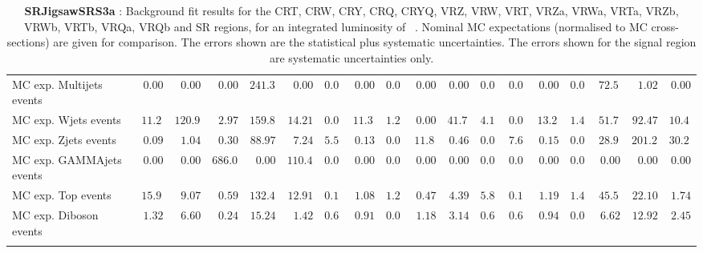 \begin{table}
{\begin{tabular*}{\textwidth}{@{\extracolsep{\fill}}lrrrrrrrrrrrrrrrrr}
\noalign{\smallskip}\hline\noalign{\smallskip}
        MC exp. Multijets events         & $0.00$          & $0.00$          & $0.00$          & $241.37$          & $0.00$          & $0.00$          & $0.00$          & $0.00$          & $0.00$          & $0.00$          & $0.00$          & $0.00$          & $0.00$          & $0.00$          & $72.55$          & $1.02$          & $0.00$              \\
        MC exp. Wjets events         & $11.24$          & $120.96$          & $2.97$          & $159.86$          & $14.21$          & $0.00$          & $11.35$          & $1.25$          & $0.00$          & $41.74$          & $4.17$          & $0.00$          & $13.29$          & $1.49$          & $51.79$          & $92.47$          & $10.46$              \\
        MC exp. Zjets events         & $0.09$          & $1.04$          & $0.30$          & $88.97$          & $7.24$          & $5.50$          & $0.13$          & $0.01$          & $11.89$          & $0.46$          & $0.03$          & $7.63$          & $0.15$          & $0.02$          & $28.99$          & $201.24$          & $30.22$              \\
        MC exp. GAMMAjets events         & $0.00$          & $0.00$          & $686.01$          & $0.00$          & $110.42$          & $0.00$          & $0.00$          & $0.00$          & $0.00$          & $0.00$          & $0.00$          & $0.00$          & $0.00$          & $0.00$          & $0.00$          & $0.00$          & $0.00$              \\
        MC exp. Top events         & $15.95$          & $9.07$          & $0.59$          & $132.46$          & $12.91$          & $0.13$          & $1.08$          & $1.27$          & $0.47$          & $4.39$          & $5.85$          & $0.14$          & $1.19$          & $1.43$          & $45.50$          & $22.10$          & $1.74$              \\
        MC exp. Diboson events         & $1.32$          & $6.60$          & $0.24$          & $15.24$          & $1.42$          & $0.61$          & $0.91$          & $0.02$          & $1.18$          & $3.14$          & $0.63$          & $0.65$          & $0.94$          & $0.02$          & $6.62$          & $12.92$          & $2.45$              \\
\noalign{\smallskip}\hline\noalign{\smallskip}
\end{tabular*}
}
\caption{{\bf SRJigsawSRS3a} : Background fit results for the CRT, CRW, CRY, CRQ, CRYQ, VRZ, VRW, VRT, VRZa, VRWa, VRTa, VRZb, VRWb, VRTb, VRQa, VRQb and SR regions, for an integrated luminosity of \ourintlumi~\ifb. Nominal MC expectations (normalised to MC cross-sections) are given for comparison. The errors shown are the statistical plus systematic uncertainties. The errors shown for the signal region are systematic uncertainties only.}
\label{table.results.systematics.in.logL.fit.CRT.CRW.CRY.CRQ.CRYQ.VRZ.VRW.VRT.VRZa.VRWa.VRTa.VRZb.VRWb.VRTb.VRQa.VRQb.SR.SRJigsawSRS3a}
\end{table}
%